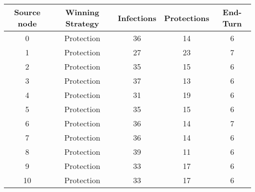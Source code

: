\documentclass[results.tex]{subfiles}
\begin{document}
    \begin{center}
        \begin{tabular}{| c || c | c | c | c |}
            \hline
            {\bfseries Source node} & {\bfseries Winning Strategy} & {\bfseries Infections} & {\bfseries Protections}
            & {\bfseries End-Turn}
            \\  %
            \hline\hline
            0                       & Protection                   & 36                     & 14                      & 6                    \\
            \hline
            1                       & Protection                   & 27                     & 23                      & 7                    \\
            \hline
            2                       & Protection                   & 35                     & 15                      & 6                    \\
            \hline
            3                       & Protection                   & 37                     & 13                      & 6                    \\
            \hline
            4                       & Protection                   & 31                     & 19                      & 6                    \\
            \hline
            5                       & Protection                   & 35                     & 15                      & 6                    \\
            \hline
            6                       & Protection                   & 36                     & 14                      & 7                    \\
            \hline
            7                       & Protection                   & 36                     & 14                      & 6                    \\
            \hline
            8                       & Protection                   & 39                     & 11                      & 6                    \\
            \hline
            9                       & Protection                   & 33                     & 17                      & 6                    \\
            \hline
            10                      & Protection                   & 33                     & 17                      & 6                    \\

\end{tabular}
\end{center}
\end{document}
